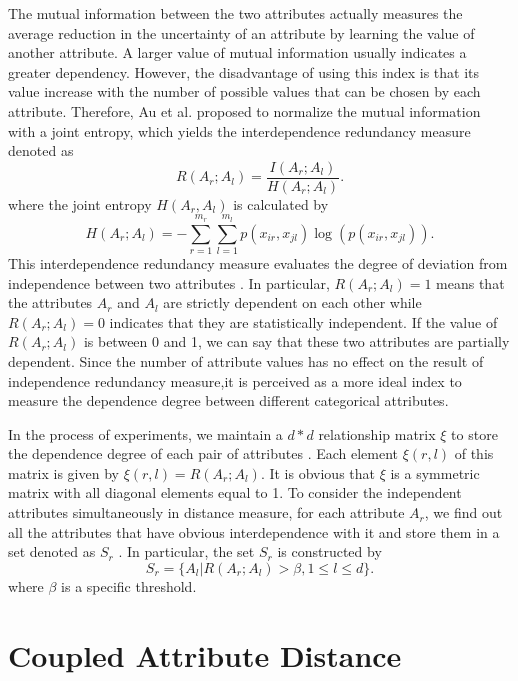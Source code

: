 \documentclass[review]{elsarticle}
\begin{document}
The mutual information between the two attributes actually measures the average reduction in the uncertainty of an attribute by learning the value of another attribute. A larger value of mutual information usually indicates a greater dependency. However, the disadvantage of using this index is that its value increase with the number of possible values that can be chosen by each attribute. Therefore, Au et al. \cite{WaiHoAu2005Grouping} proposed to normalize the mutual information with a joint entropy, which yields the interdependence redundancy measure denoted as
\begin{equation}
R(A_r;A_l) = \frac{I(A_r;A_l)}{H(A_r;A_l)}.
\label{equ14}
\end{equation}
where the joint entropy $H(A_r,A_l)$ is calculated by
\begin{equation}
H(A_r;A_l) = - \sum_{r=1}^{m_r}\sum_{l=1}^{m_l}p(x_{ir},x_{jl})\log(p(x_{ir},x_{jl})).
\label{equ15}
\end{equation}
This interdependence redundancy measure evaluates the degree of deviation from independence between two attributes \cite{WaiHoAu2005Grouping}. In particular, $R(A_r;A_l) = 1$ means that the attributes $A_r$ and $A_l$ are strictly dependent on each other while $R(A_r;A_l) = 0$ indicates that they are statistically independent. If the value of $R(A_r;A_l)$ is between 0 and 1, we can say that these two attributes are partially dependent. Since the number of attribute values has no effect on the result of independence redundancy measure,it is perceived as a more ideal index to measure the dependence degree between different categorical attributes.

In the process of experiments, we maintain a $d*d$ relationship matrix $\xi$ to store the dependence degree of each pair of attributes \cite{JiaH2016NewMetric}. Each element $\xi(r,l)$ of this matrix is given by $\xi(r,l) = R(A_r;A_l)$. It is obvious that $\xi$ is a symmetric matrix with all diagonal elements equal to 1. To consider the independent attributes simultaneously in distance measure, for each attribute $A_r$, we find out all the attributes that have obvious interdependence with it and store them in a set denoted as $S_r$ \cite{JiaH2016NewMetric}. In particular, the set $S_r$ is constructed by
\begin{equation}
S_r = \{A_l|R(A_r;A_l) > \beta, 1 \leq l \leq d \}.
\label{equ16}
\end{equation}
where $\beta$ is a specific threshold.

\section{Coupled Attribute Distance}
\end{document}
